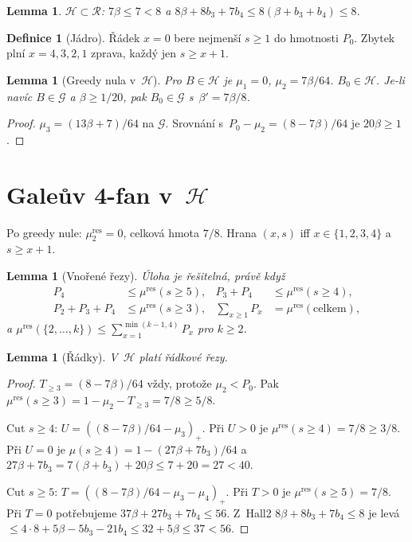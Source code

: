\documentclass[11pt,a4paper]{article}
\newtheorem{lemma}[theorem]{Lemma}
\theoremstyle{definition}
\newtheorem{definition}[theorem]{Definice}
\theoremstyle{remark}
\newcommand{\cG}{\mathcal G}
\newcommand{\cH}{\mathcal H}
\newcommand{\cR}{\mathcal R}
\begin{document}
\begin{lemma}
\label{lem:H-in-R}
\(\cH\subset\cR\): \(7\beta\le 7<8\) a \(8\beta+8b_3+7b_4\le 8(\beta+b_3+b_4)\le 8\).
\end{lemma}

\begin{definition}[Jádro]
\label{def:kernel}
Řádek \(x=0\) bere nejmenší \(s\ge 1\) do hmotnosti \(P_0\).
Zbytek plní \(x=4,3,2,1\) zprava, každý jen \(s\ge x+1\).
\end{definition}

\begin{lemma}[Greedy nula v~\(\cH\)]
\label{lem:greedy0}
Pro \(B\in\cH\) je \(\mu_1=0\), \(\mu_2=7\beta/64\). \(B_0\in\cH\).
Je-li navíc \(B\in\cG\) a \(\beta\ge 1/20\), pak \(B_0\in\cG\) s~\(\beta'=7\beta/8\).
\end{lemma}

\begin{proof}
\(\mu_3=(13\beta+7)/64\) na \(\cG\). Srovnání s~\(P_0-\mu_2=(8-7\beta)/64\) je \(20\beta\ge 1\).
\end{proof}

\section{Galeův 4-fan v~\(\cH\)}
\label{sec:gale}

Po greedy nule: \(\mu^{\mathrm{res}}_2=0\), celková hmota \(7/8\).
Hrana \((x,s)\) iff \(x\in\{1,2,3,4\}\) a \(s\ge x+1\).

\begin{lemma}[Vnořené řezy]
\label{lem:gale-form}
Úloha je řešitelná, právě když
\[
\begin{aligned}
P_4&\le\mu^{\mathrm{res}}(s\ge 5),&
P_3+P_4&\le\mu^{\mathrm{res}}(s\ge 4),\\
P_2+P_3+P_4&\le\mu^{\mathrm{res}}(s\ge 3),&
\sum_{x\ge 1}P_x&=\mu^{\mathrm{res}}(\mathrm{celkem}),
\end{aligned}
\]
a \(\mu^{\mathrm{res}}(\{2,\dots,k\})\le\sum_{x=1}^{\min(k-1,4)}P_x\) pro \(k\ge 2\).
\end{lemma}

\begin{lemma}[Řádky]
\label{lem:row}
V~\(\cH\) platí řádkové řezy.
\end{lemma}

\begin{proof}
\(T_{\ge 3}=(8-7\beta)/64\) vždy, protože \(\mu_2<P_0\).
Pak \(\mu^{\mathrm{res}}(s\ge 3)=1-\mu_2-T_{\ge 3}=7/8\ge 5/8\).

Cut \(s\ge 4\): \(U=((8-7\beta)/64-\mu_3)_+\).
Při \(U>0\) je \(\mu^{\mathrm{res}}(s\ge 4)=7/8\ge 3/8\).
Při \(U=0\) je \(\mu(s\ge 4)=1-(27\beta+7b_3)/64\) a \(27\beta+7b_3=7(\beta+b_3)+20\beta\le 7+20=27<40\).

Cut \(s\ge 5\): \(T=((8-7\beta)/64-\mu_3-\mu_4)_+\).
Při \(T>0\) je \(\mu^{\mathrm{res}}(s\ge 5)=7/8\).
Při \(T=0\) potřebujeme \(37\beta+27b_3+7b_4\le 56\).
Z~Hall2 \(8\beta+8b_3+7b_4\le 8\) je levá \(\le 4\cdot 8+5\beta-5b_3-21b_4\le 32+5\beta\le 37<56\).
\end{proof}
\end{document}
